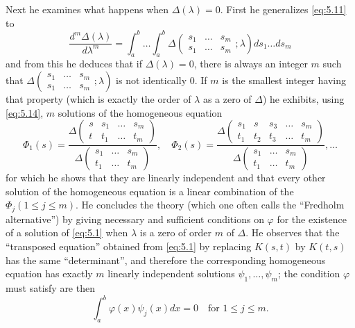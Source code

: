 \documentclass[12pt,a4paper,leqno,twoside]{extbook}
\begin{document}
Next he examines what happens when \(\Delta(\lambda) = 0\). First he generalizes \eqref{eq:5.11} to
\begin{equation}
    \label{eq:5.20}
    \frac{d^m \Delta(\lambda)}{d\lambda^m} = \int_a^b \ldots \int_a^b \Delta
    \left(
    \begin{matrix}
        s_1 & \ldots & s_m \\
        s_1 & \ldots & s_m
    \end{matrix}
    ; \lambda
    \right)
    ds_1 \ldots ds_m
\end{equation}
and from this he deduces that if \(\Delta(\lambda) = 0\), there is always an integer \(m\) such that \(\Delta
\left(
\begin{matrix}
    s_1 & \ldots & s_m \\
    s_1 & \ldots & s_m
\end{matrix}
; \lambda
\right)\)
is not identically 0. If \(m\) is the smallest integer having that property (which is exactly the order of \(\lambda\) as a zero of \(\Delta\)) he exhibits, using \eqref{eq:5.14}, \(m\) solutions of the homogeneous equation
\begin{equation}
    \label{eq:5.21}
    \Phi_1(s) = \frac{\Delta
    \left(
    \begin{matrix}
        s & s_1 & \ldots & s_m \\
        t & t_1 & \ldots & t_m
    \end{matrix}
    \right)}{\Delta
    \left(
    \begin{matrix}
        s_1 & \ldots & s_m \\
        t_1 & \ldots & t_m
    \end{matrix}
    \right)}, \quad
    \Phi_2(s) = \frac{\Delta
    \left(
    \begin{matrix}
        s_1 & s   & s_3 & \ldots & s_m \\
        t_1 & t_2 & t_3 & \ldots & t_m
    \end{matrix}
    \right)}{\Delta
    \left(
    \begin{matrix}
        s_1 & \ldots & s_m \\
        t_1 & \ldots & t_m
    \end{matrix}
    \right)}, \ldots
\end{equation}
for which he shows that they are linearly independent and that every other solution of the homogeneous equation is a linear combination of the \(\Phi_j (1 \leq j \leq m)\). He concludes the theory (which one often calls the ``Fredholm alternative'') by giving necessary and sufficient conditions on \(\varphi\) for the existence of a solution of \eqref{eq:5.1} when \(\lambda\) is a zero of order \(m\) of \(\Delta\). He observes that the ``transposed equation'' obtained from \eqref{eq:5.1} by replacing \(K(s,t)\) by \(K(t,s)\) has the same ``determinant'', and therefore the corresponding homogeneous equation has exactly \(m\) linearly independent solutions \(\psi_1, \ldots, \psi_m\); the condition \(\varphi\) must satisfy are then
\begin{equation}
    \label{eq:5.22}
    \int_a^b \varphi(x)\psi_j(x)dx = 0 \quad \text{for } 1 \leq j \leq m.
\end{equation}
\end{document}

